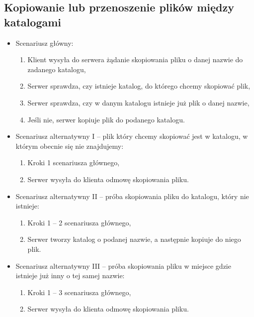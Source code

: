 \documentclass[10pt,a4paper]{article}
\begin{document}
\subsection{Kopiowanie lub przenoszenie plików między katalogami}
\begin{itemize}
    \item Scenariusz główny:
    \begin{enumerate}
        \item Klient wysyła do serwera żądanie skopiowania pliku o danej nazwie do zadanego katalogu,
        \item Serwer sprawdza, czy istnieje katalog, do którego chcemy skopiować plik,
        \item Serwer sprawdza, czy w danym katalogu istnieje już plik o danej nazwie,
        \item Jeśli nie, serwer kopiuje plik do podanego katalogu.
    \end{enumerate}

    \item Scenariusz alternatywny I -- plik który chcemy skopiować jest w katalogu, w którym obecnie się nie znajdujemy:
    \begin{enumerate}
        \item Kroki 1  scenariusza głównego,
        \item Serwer wysyła do klienta odmowę skopiowania pliku.
    \end{enumerate}


    \item Scenariusz alternatywny II -- próba skopiowania pliku do katalogu, który nie istnieje:
    \begin{enumerate}
        \item Kroki 1 -- 2 scenariusza głównego,
        \item Serwer tworzy katalog o podanej nazwie, a następnie kopiuje do niego plik.
    \end{enumerate}

    \item Scenariusz alternatywny III -- próba skopiowania pliku w miejsce gdzie istnieje już inny o tej samej nazwie:
    \begin{enumerate}
        \item Kroki 1 -- 3 scenariusza głównego,
        \item Serwer wysyła do klienta odmowę skopiowania pliku.
    \end{enumerate}
\end{itemize}
\end{document}
